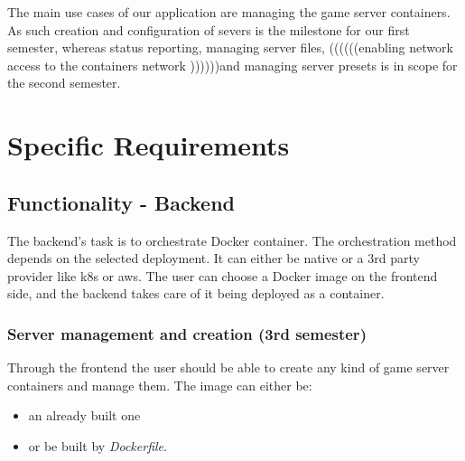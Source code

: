 \documentclass[a4paper,12pt,chapterprefix=false,bibliography=totoc,listof=totoc,]{scrreprt}
\begin{document}
The main use cases of our application are managing the game server containers.
As such creation and configuration of severs is the milestone for our first semester, whereas status reporting, managing server files, ((((((enabling network access to the containers network ))))))and managing server presets is in scope for the second semester.

\chapter{Specific Requirements}

\section{Functionality - Backend}


The backend's task is to orchestrate Docker container. The orchestration method depends on the selected deployment. It can either be native or a 3rd party provider like \gls{k8s} or \gls{aws}. The user can choose a Docker image on the frontend side, and the backend takes care of it being deployed as a container.

\subsection{Server management and creation (3rd semester)}
Through the frontend the user should be able to create any kind of game server containers and manage them. The image can either be:
\begin{itemize}
	\item an already built one 
	\item or be built by \emph{Dockerfile}.
\end{itemize}
 
\end{document}
